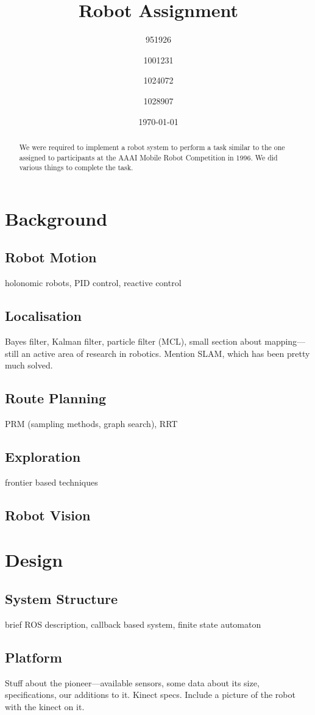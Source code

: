 \documentclass[conference]{IEEEtran}
\title{Robot Assignment}
\author{951926 \and 1001231 \and 1024072 \and 1028907}
\date{\today}
\begin{document}
\maketitle

\begin{abstract}
  We were required to implement a robot system to perform a task similar to the one assigned to participants at the AAAI Mobile Robot Competition in 1996\cite{AAAIcomp}. We did various things to complete the task.
\end{abstract}
\section{Background}
\subsection{Robot Motion}
holonomic robots, PID control, reactive control
\subsection{Localisation}
Bayes filter, Kalman filter, particle filter (MCL), small section about mapping---still an active area of research in robotics. Mention SLAM, which has been pretty much solved.
\subsection{Route Planning}
PRM (sampling methods, graph search), RRT
\subsection{Exploration}
frontier based techniques
\subsection{Robot Vision}
\section{Design}
\subsection{System Structure}
brief ROS description, callback based system, finite state automaton
\subsection{Platform}
Stuff about the pioneer---available sensors, some data about its size, specifications, our additions to it. Kinect specs. Include a picture of the robot with the kinect on it. 
\end{document}
